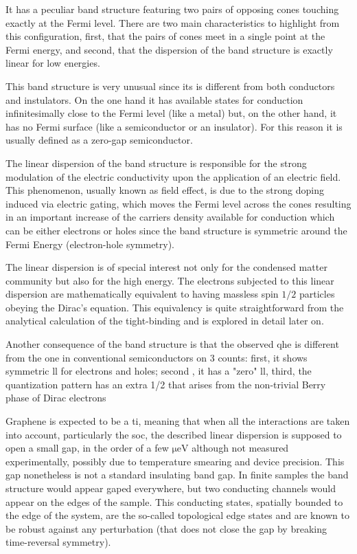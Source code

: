 It has a peculiar band structure featuring two pairs of opposing cones touching exactly at the Fermi level. There are two main characteristics to highlight from this configuration, first, that the pairs of cones meet in a single point at the Fermi energy, and second, that the dispersion of the band structure is exactly linear for low energies.

This band structure is very unusual since its is different from both conductors and instulators. On the one hand it has available states for conduction infinitesimally close to the Fermi level (like a metal) but, on the other hand, it has no Fermi surface (like a semiconductor or an insulator). For this reason it is usually defined as a zero-gap semiconductor.

The linear dispersion of the band structure is responsible for the strong modulation of the electric conductivity upon the application of an electric field. This phenomenon, usually known as field effect, is due to the strong doping induced via electric gating, which moves the Fermi level across the cones resulting in an important increase of the carriers density available for conduction which can be either electrons or holes since the band structure is symmetric around the Fermi Energy (electron-hole symmetry).
\medskip

The linear dispersion is of special interest not only for the condensed matter community but also for the high energy. The electrons  subjected to this linear dispersion are mathematically equivalent to having massless spin $1/2$ particles obeying the Dirac's equation. This equivalency is quite straightforward from the analytical calculation of the tight-binding and is explored in detail later on.
\medskip


Another consequence of the band structure is that the observed \ac{qhe}\cite{Zheng2002,Zhang2005,Gusynin2005,Peres2006a,Brey2006,Fertig2007,Ostrovsky2008,Fujita2016} is different from the one in conventional semiconductors on 3  counts: first, it shows symmetric \ac{ll} for electrons and holes; second , it has a "zero" \ac{ll}, third, the quantization pattern has an extra 1/2 that arises from the non-trivial Berry phase of Dirac electrons

Graphene is expected to be a \ac{ti}\cite{Blick2019}, meaning that when all the interactions are taken into account, particularly the \ac{soc}, the described linear dispersion is supposed to open a small gap, in the order of a few $\si{\micro\eV}$ %
although not measured experimentally, possibly due to temperature smearing and device precision.
This gap nonetheless is not a standard insulating band gap. In finite samples the band structure would appear gaped everywhere, but two conducting channels would appear on the edges of the sample.
This conducting states, spatially bounded to the edge of the system, are the so-called topological edge states and are known to be robust against any perturbation (that does not close the gap by breaking time-reversal symmetry).  %

